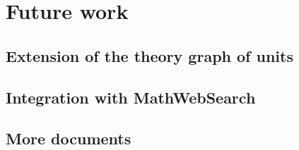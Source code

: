 \section{Future work}
\subsection{Extension of the theory graph of units}

\subsection{Integration with MathWebSearch}
\subsection{More documents}




